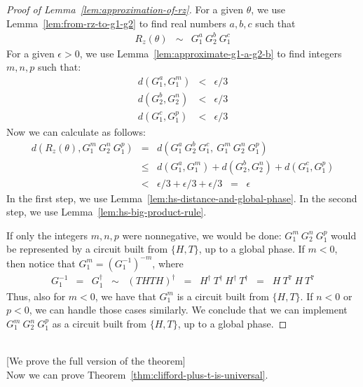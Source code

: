 \documentclass[11pt]{article}
\def\({\begin{eqnarray*}}
\def\){\end{eqnarray*}}
\begin{document}
\begin{proof}[Proof of Lemma~\ref{lem:approximation-of-rz}]
For a given $\theta$, 
we use Lemma~\ref{lem:from-rz-to-g1-g2} to find real numbers $a,b,c$ such that
\(
R_z(\theta) &\sim& G_1^a\ G_2^b\ G_1^c
\)
For a given $\epsilon > 0$, we use 
Lemma~\ref{lem:approximate-g1-a-g2-b} 
to find integers $m,n,p$ such that:
\(
d(G_1^a, G_1^m) &<& \epsilon/3 \\
d(G_2^b, G_2^n) &<& \epsilon/3 \\
d(G_1^c, G_1^p) &<& \epsilon/3
\)
Now we can calculate as follows:
\(
d(R_z(\theta), G_1^m\ G_2^n\ G_1^p) 
&=& 
d(G_1^a\ G_2^b\ G_1^c,\ G_1^m\ G_2^n\ G_1^p) 
\\
&\leq&
d(G_1^a, G_1^m) + d(G_2^b, G_2^n) + d(G_1^c, G_1^p)
\\
&<&
\epsilon/3 + \epsilon/3 + \epsilon/3
\;\;=\;\; 
\epsilon
\)
In the first step, we use Lemma~\ref{lem:hs-distance-and-global-phase}.
In the second step, we use Lemma~\ref{lem:hs-big-product-rule}.

If only the integers $m,n,p$ were nonnegative, we would be done:
$G_1^m\ G_2^n\ G_1^p$ would be represented by a circuit built from $\{H,T\}$,
up to a global phase.
If $m < 0$, then notice that 
$G_1^m = (G_1^{-1})^{-m}$, where 
\(
G_1^{-1} &=& G_1^\dag 
\;\;\sim\;\; 
(THTH)^\dag 
\;\;=\;\;
H^\dag\ T^\dag\ H^\dag\ T^\dag
\;\;=\;\;
H\ T^7\ H\ T^7
\)
Thus, also for $m < 0$, we have that $G_1^m$ is a circuit built from $\{H,T\}$.
If $n < 0$ or $p < 0$, we can handle those cases similarly.
We conclude that we can implement $G_1^m\ G_2^n\ G_1^p$ as a circuit built 
from $\{H,T\}$, 
up to a global phase.
\end{proof}

\newpage

\mbox{} \\ \hspace*{1cm}
   [We prove the full version of the theorem] \\
Now we can prove Theorem~\ref{thm:clifford-plus-t-is-universal}.
\end{document}
